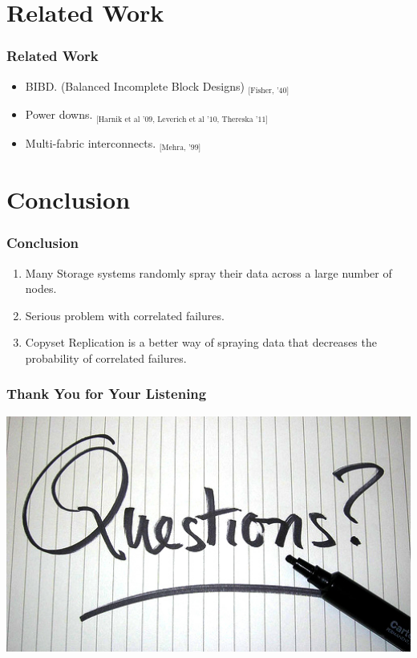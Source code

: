 \documentclass[xcolor=table]{beamer}
\begin{document}
	\section{Related Work}

	\begin{frame}
		\frametitle{Related Work}
		\begin{itemize}
			\item BIBD. (Balanced Incomplete Block Designs) $_\text{[Fisher, '40]}$
			\item Power downs. $_\text{[Harnik et al '09, Leverich et al '10, Thereska '11]}$
			\item Multi-fabric interconnects. $_\text{[Mehra, '99]}$
		\end{itemize}
	\end{frame}

	\section{Conclusion}

	\begin{frame}
		\frametitle{Conclusion}
		\begin{enumerate}
			\item Many Storage systems \alert{randomly} spray their data across a large number of nodes.
			\item Serious problem with \alert{correlated failures}.
			\item \alert{Copyset Replication} is a better way of spraying data that \alert{decreases the probability} of correlated failures.
		\end{enumerate}
	\end{frame}

	\begin{frame}
		\frametitle{Thank You for Your Listening}
		\includegraphics[width=1\textwidth]{8.jpg}
	\end{frame}
\end{document}
